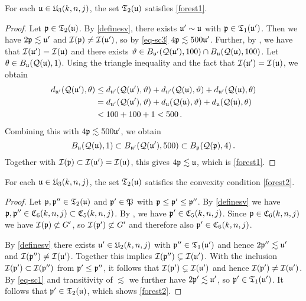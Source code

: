 \begin{lemma}
    \label{forest-geometry}
    \leanok
    For each $\fu\in \fU_3(k,n,j)$,
    the set $\mathfrak{T}_2(\fu)$
    satisfies \eqref{forest1}.
\end{lemma}
\begin{proof}
    \leanok
    Let $\fp \in \mathfrak{T}_2(\fu)$. By \eqref{definesv}, there exists $\fu' \sim \fu$ with $\fp \in \mathfrak{T}_1(\fu')$. Then we have $2\fp \lesssim \fu'$ and $\scI(\fp) \ne \scI(\fu')$, so by \eqref{eq-sc3} $4\fp \lesssim 500\fu'$.
    Further, by , we have that $\scI(\fu') = \scI(\fu)$ and there exists $\mfa \in B_{\fu'}(\fcc(\fu'),100) \cap B_{\fu}(\fcc(\fu),100)$.
    Let $\mfb \in B_{\fu}(\fcc(\fu), 1)$.
    Using the triangle inequality and the fact that $\scI(\fu') =\scI(\fu)$, we obtain
    \begin{align*}
        d_{\fu'}(\fcc(\fu'), \mfb) &\le d_{\fu'}(\fcc(\fu'), \mfa) + d_{\fu'}(\fcc(\fu), \mfa) + d_{\fu'}(\fcc(\fu), \mfb)\\
        &= d_{\fu'}(\fcc(\fu'), \mfa) + d_{\fu}(\fcc(\fu), \mfa) + d_{\fu}(\fcc(\fu), \mfb)\\
        &< 100 + 100 + 1 < 500\,.
    \end{align*}
    Combining this with $4\fp \lesssim 500\fu'$, we obtain
    $$
        B_{\fu}(\fcc(\fu), 1) \subset B_{\fu'}(\fcc(\fu'), 500) \subset B_{\fp}(\fcc(\fp), 4)\,.
    $$
    Together with $\scI(\fp) \subset \scI(\fu') = \scI(\fu)$, this gives $4\fp \lesssim \fu$, which is \eqref{forest1}.
\end{proof}

\begin{lemma}
    \label{forest-convex}
    \leanok
    For each $\fu\in \fU_3(k,n,j)$,
    the set $\mathfrak{T}_2(\fu)$
    satisfies the convexity condition \eqref{forest2}.
\end{lemma}

\begin{proof}
    \leanok
    Let $\fp, \fp'' \in \mathfrak{T}_2(\fu)$ and $\fp' \in \fP$ with $\fp \le \fp' \le \fp''$. By \eqref{definesv} we have $\fp, \fp'' \in \fC_6(k,n,j) \subset \fC_5(k,n,j)$. By , we have $\fp' \in \fC_5(k,n,j)$. Since $\fp \in \fC_6(k,n,j)$ we have $\scI(\fp) \not \subset G'$, so $\scI(\fp') \not \subset G'$ and therefore also $\fp' \in \fC_6(k,n,j)$.

    By \eqref{definesv} there exists $\fu' \in \fU_2(k,n,j)$ with $\fp'' \in \mathfrak{T}_1(\fu')$ and hence $2\fp'' \lesssim \fu'$ and $\scI(\fp'') \ne \scI(\fu')$. Together this implies $\scI(\fp'') \subsetneq \scI(\fu')$. With the inclusion $\scI(\fp') \subset \scI(\fp'')$ from $\fp' \le \fp''$, it follows that $\scI(\fp') \subsetneq \scI(\fu')$ and hence $\scI(\fp') \ne \scI(\fu')$.
    By \eqref{eq-sc1} and transitivity of $\lesssim$ we further have $2\fp' \lesssim \fu'$, so $\fp' \in \mathfrak{T}_1(\fu')$.
    It follows that $\fp' \in \mathfrak{T}_2(\fu)$, which shows \eqref{forest2}.
\end{proof}

